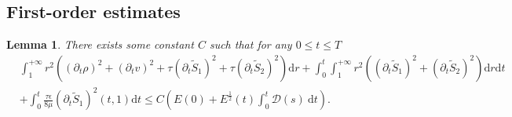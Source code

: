 \documentclass[10pt,reqno]{amsart}
\numberwithin{equation}{section}
\newtheorem{lemma}[theorem]{Lemma}
\begin{document}
	\subsection{First-order estimates}
	
	\begin{lemma}\label{lem2}
		There exists some constant $C$ such that for any $0\le t \le T$
		\begin{equation}\label{hu3.13}
			\begin{aligned}
				&\int_{1}^{+\infty}  r^2\left((\partial_{t}\rho)^2+(\partial_{t}v)^2
				+\tau  (\partial_{t}\tilde{S}_1)^2+\tau (\partial_{t}\tilde{S}_2)^2\right)\mathrm{d}r
				+ \int_0^t \int_{1}^{+\infty}r^2\left(  (\partial_{t}\tilde{S}_1)^2+ (\partial_{t}\tilde{S}_2)^2\right)\mathrm{d}r\mathrm{d}t\\
				&+\int_{0}^{t}\frac{\tau \epsilon}{8 \mu}(\partial_t\tilde{S}_1)^2(t,1)\mathrm{d}t
				\leq C\left(E(0)+ E^{\frac{1}{2}}(t) \int_{0}^{t}\mathcal{D}(s)\mathrm{~d} t\right).	
			\end{aligned}
		\end{equation}
	\end{lemma}
\end{document}

